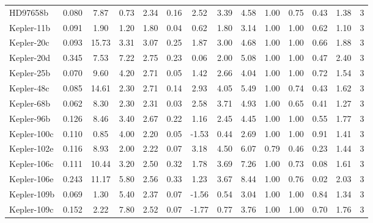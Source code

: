 \documentclass[]{emulateapj}
\begin{document}
\begin{table*}[h]
\begin{center}
{\begin{tabular}{lcccccccc|ccc|cc}
 HD97658b     &   0.080 &    7.87 &    0.73 &    2.34 &    0.16 &    2.52 &    3.39 &    4.58 &    1.00 &    0.75 &    0.43 &    1.38 &     3\\
 Kepler-11b   &   0.091 &    1.90 &    1.20 &    1.80 &    0.04 &    0.62 &    1.80 &    3.14 &    1.00 &    1.00 &    0.62 &    1.10 &     3\\
 Kepler-20c   &   0.093 &   15.73 &    3.31 &    3.07 &    0.25 &    1.87 &    3.00 &    4.68 &    1.00 &    1.00 &    0.66 &    1.88 &     3\\
 Kepler-20d   &   0.345 &    7.53 &    7.22 &    2.75 &    0.23 &    0.06 &    2.00 &    5.08 &    1.00 &    1.00 &    0.47 &    2.40 &     3\\
 Kepler-25b   &   0.070 &    9.60 &    4.20 &    2.71 &    0.05 &    1.42 &    2.66 &    4.04 &    1.00 &    1.00 &    0.72 &    1.54 &     3\\
 Kepler-48c   &   0.085 &   14.61 &    2.30 &    2.71 &    0.14 &    2.93 &    4.05 &    5.49 &    1.00 &    0.74 &    0.43 &    1.62 &     3\\
 Kepler-68b   &   0.062 &    8.30 &    2.30 &    2.31 &    0.03 &    2.58 &    3.71 &    4.93 &    1.00 &    0.65 &    0.41 &    1.27 &     3\\
 Kepler-96b   &   0.126 &    8.46 &    3.40 &    2.67 &    0.22 &    1.16 &    2.45 &    4.45 &    1.00 &    1.00 &    0.55 &    1.77 &     3\\
 Kepler-100c  &   0.110 &    0.85 &    4.00 &    2.20 &    0.05 &   -1.53 &    0.44 &    2.69 &    1.00 &    1.00 &    0.91 &    1.41 &     3\\
 Kepler-102e  &   0.116 &    8.93 &    2.00 &    2.22 &    0.07 &    3.18 &    4.50 &    6.07 &    0.79 &    0.46 &    0.23 &    1.44 &     3\\
 Kepler-106c  &   0.111 &   10.44 &    3.20 &    2.50 &    0.32 &    1.78 &    3.69 &    7.26 &    1.00 &    0.73 &    0.08 &    1.61 &     3\\
 Kepler-106e  &   0.243 &   11.17 &    5.80 &    2.56 &    0.33 &    1.23 &    3.67 &    8.44 &    1.00 &    0.76 &    0.02 &    2.03 &     3\\
 Kepler-109b  &   0.069 &    1.30 &    5.40 &    2.37 &    0.07 &   -1.56 &    0.54 &    3.04 &    1.00 &    1.00 &    0.84 &    1.34 &     3\\
 Kepler-109c  &   0.152 &    2.22 &    7.80 &    2.52 &    0.07 &   -1.77 &    0.77 &    3.76 &    1.00 &    1.00 &    0.70 &    1.76 &     3\\


\end{tabular}}
\end{center}
\end{table*}
\end{document}
